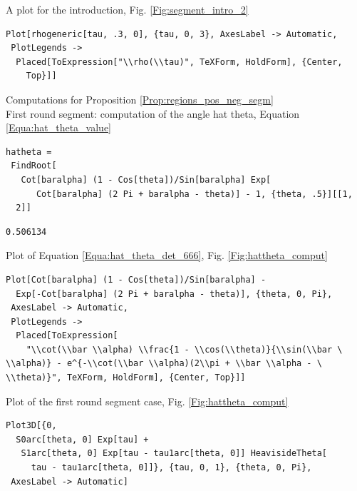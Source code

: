 \documentclass[reqno]{amsart}
\theoremstyle{definition} \newtheorem{definition}{Definition}[section]
\theoremstyle{definition} \newtheorem{remark}[definition]{Remark}
\theoremstyle{plain} \newtheorem{lemma}[definition]{Lemma}
\theoremstyle{plain} \newtheorem{proposition}[definition]{Proposition}
\theoremstyle{plain} \newtheorem{theorem}[definition]{Theorem}
\theoremstyle{plain} \newtheorem{corollary}[definition]{Corollary}
\theoremstyle{definition} \newtheorem{example}[definition]{Example}
\theoremstyle{plain} \newtheorem{claim}[clai]{Claim}
\theoremstyle{definition} \newtheorem{assumption}[definition]{Assumption}
\theoremstyle{definition} \newtheorem{observation}[definition]{Observation}
\newcommand{\1}{\mathbbm 1}
\numberwithin{equation}{section} %
\theoremstyle{plain} \newtheorem*{theorem*}{Theorem}
\theoremstyle{plain} \newtheorem{mthm}[maintheorem]{Main Theorem}
\theoremstyle{plain} \newtheorem*{mthm*}{Main Theorem}
\theoremstyle{plain} \newtheorem*{conjecture*}{Conjecture}
\theoremstyle{plain} \newtheorem{conjecture}[definition]{Conjecture}
\theoremstyle{plain} \newtheorem*{problem*}{Problem}
\begin{document}
\bigskip


\bigskip

\noindent A plot for the introduction, Fig. \ref{Fig:segment_intro_2}
\medskip
\begin{verbatim}
Plot[rhogeneric[tau, .3, 0], {tau, 0, 3}, AxesLabel -> Automatic, 
 PlotLegends -> 
  Placed[ToExpression["\\rho(\\tau)", TeXForm, HoldForm], {Center, 
    Top}]]
\end{verbatim}
\medskip
Computations for Proposition \ref{Prop:regions_pos_neg_segm} \\
First round segment: computation of the angle hat theta, Equation \eqref{Equa:hat_theta_value}
\medskip
\begin{verbatim}
hatheta = 
 FindRoot[
   Cot[baralpha] (1 - Cos[theta])/Sin[baralpha] Exp[
      Cot[baralpha] (2 Pi + baralpha - theta)] - 1, {theta, .5}][[1, 
  2]]
\end{verbatim}
\begin{verbatim}
0.506134
\end{verbatim}
\medskip
Plot of Equation \eqref{Equa:hat_theta_det_666}, Fig. \ref{Fig:hattheta_comput}
\medskip
\begin{verbatim}
Plot[Cot[baralpha] (1 - Cos[theta])/Sin[baralpha] - 
  Exp[-Cot[baralpha] (2 Pi + baralpha - theta)], {theta, 0, Pi}, 
 AxesLabel -> Automatic, 
 PlotLegends -> 
  Placed[ToExpression[
    "\\cot(\\bar \\alpha) \\frac{1 - \\cos(\\theta)}{\\sin(\\bar \
\\alpha)} - e^{-\\cot(\\bar \\alpha)(2\\pi + \\bar \\alpha - \
\\theta)}", TeXForm, HoldForm], {Center, Top}]]
\end{verbatim}
\medskip
Plot of the first round segment case, Fig. \ref{Fig:hattheta_comput}
\medskip
\begin{verbatim}
Plot3D[{0, 
  S0arc[theta, 0] Exp[tau] + 
   S1arc[theta, 0] Exp[tau - tau1arc[theta, 0]] HeavisideTheta[
     tau - tau1arc[theta, 0]]}, {tau, 0, 1}, {theta, 0, Pi}, 
 AxesLabel -> Automatic]
\end{verbatim}
\end{document}
